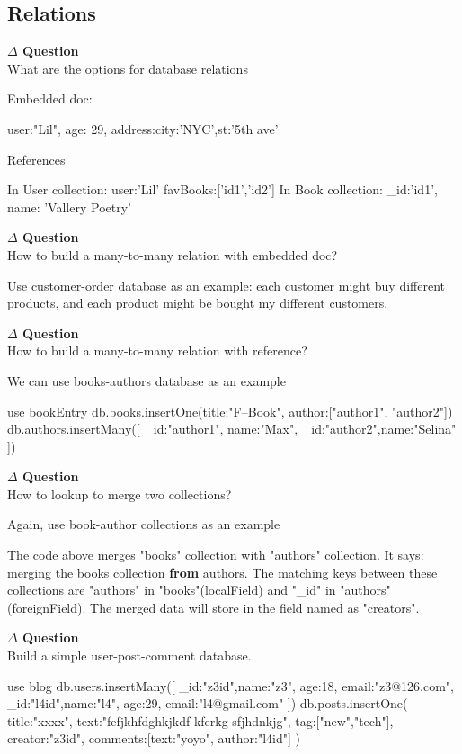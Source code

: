\documentclass[12pt]{article}
\newenvironment{que}
    { \begin{mdframed}[backgroundcolor=green!20] \textbf{$\Delta$ Question} \\}
    {  \end{mdframed}}
\begin{document}
\subsection{Relations}
\begin{que}
What are the options for database relations
\end{que}
Embedded doc:
\begin{code}
{
user:"Lil",
age: 29,
address:{city:'NYC',st:'5th ave'}
}
\end{code}
References
\begin{code}
In User collection:
{
user:'Lil'
favBooks:['id1','id2']
}
In Book collection:
{
_id:'id1',
name: 'Vallery Poetry'
}
\end{code}
\begin{que}
How to build a many-to-many relation with embedded doc?
\end{que}
Use customer-order database as an example: each customer might buy different products, and each product might be bought my different customers.
\begin{que}
How to build a many-to-many relation with reference?
\end{que}
We can use books-authors database as an example
\begin{code}
use bookEntry
db.books.insertOne({title:"F--Book", author:["author1", "author2"]})
db.authors.insertMany([
{_id:"author1", name:"Max"},
{_id:"author2",name:"Selina"}
])
\end{code}
\begin{que}
How to lookup to merge two collections?
\end{que}
Again, use book-author collections as an example
The code above merges "books" collection with "authors" collection. It says: merging the books collection \textbf{from} authors. The matching keys between these collections are "authors" in "books"(localField) and "\_id" in "authors"(foreignField). The merged data will store in the field named as "creators".
\begin{que}
Build a simple user-post-comment database.
\end{que}
\begin{code}
use blog
db.users.insertMany([
{_id:"z3id",name:"z3", age:18, email:"z3@126.com"},
{_id:"l4id",name:"l4", age:29, email:"l4@gmail.com"}
])
db.posts.insertOne({
title:"xxxx",
text:"fefjkhfdghkjkdf kferkg sfjhdnkjg",
tag:["new","tech"],
creator:"z3id",
comments:[{text:"yoyo", author:"l4id"}]
})
\end{code}
\end{document}

